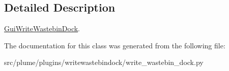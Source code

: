 \subsection{Detailed Description}
\hyperlink{classplume-creator_1_1src_1_1plume_1_1plugins_1_1writewastebindock_1_1write__wastebin__dock_1_1_gui_write_wastebin_dock}{Gui\+Write\+Wastebin\+Dock}. 

The documentation for this class was generated from the following file\+:\begin{DoxyCompactItemize}
\item 
src/plume/plugins/writewastebindock/write\+\_\+wastebin\+\_\+dock.\+py\end{DoxyCompactItemize}
